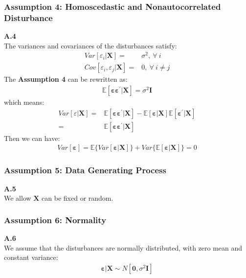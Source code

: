 \documentclass{article}
\begin{document}
\subsubsection{Assumption 4: Homoscedastic and Nonautocorrelated Disturbance}
\textbf{A.4}\\ 
The variances and covariances of the disturbances satisfy:
	\begin{align*}
		Var[\varepsilon_i | \boldsymbol{X}] = &\sigma^2,\ \forall\ i\\
		Cov[\varepsilon_i, \varepsilon_j | \boldsymbol{X}] = &0,\ \forall\ i \neq j
	\end{align*}
The \textbf{Assumption 4} can be rewritten as:
	\begin{align*}
		\mathbb{E}[\boldsymbol{\varepsilon}\boldsymbol{\varepsilon}^\prime | \boldsymbol{X}] = \sigma^2\boldsymbol{I}
	\end{align*} 
which means:
	\begin{align*}
		Var[\varepsilon | \boldsymbol{X}] = &\mathbb{E}[\boldsymbol{\varepsilon}\boldsymbol{\varepsilon}^\prime | \boldsymbol{X}] - \mathbb{E}[\boldsymbol{\varepsilon} | \boldsymbol{X}] \mathbb{E}[\boldsymbol{\varepsilon}^\prime | \boldsymbol{X}]\\
		= &\mathbb{E}[\boldsymbol{\varepsilon}\boldsymbol{\varepsilon}^\prime | \boldsymbol{X}]
	\end{align*}
Then we can have:
	\begin{align*}
		Var[\boldsymbol{\varepsilon}] = \mathbb{E}\{ Var[\boldsymbol{\varepsilon} | \boldsymbol{X}] \} + Var\{ \mathbb{E}[\boldsymbol{\varepsilon} | \boldsymbol{X}] \} = 0
	\end{align*}

\subsubsection{Assumption 5: Data Generating Process}
\textbf{A.5}\\ 
We allow $\boldsymbol{X}$ can be fixed or random.

\subsubsection{Assumption 6: Normality}
\textbf{A.6}\\
We assume that the disturbances are normally distributed, with zero mean and constant variance:
	\begin{align*}
		\boldsymbol{\varepsilon} | \boldsymbol{X} \sim N[\boldsymbol{0}, \sigma^2\boldsymbol{I}]
	\end{align*}
\end{document}
